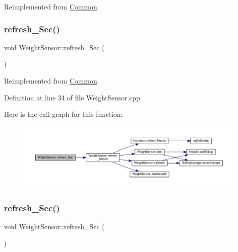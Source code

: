 Reimplemented from \hyperlink{class_common_a14e4462a94bd118028ce1d487ca0292c}{Common}.

\mbox{\label{class_weight_sensor_a6f7c6cab318b6677e43b7deb9e0b5fee}} 
\subsubsection{\texorpdfstring{refresh\+\_\+\+Sec()}{refresh\_Sec()}\hspace{0.1cm}{\footnotesize\ttfamily [1/2]}}
{\footnotesize\ttfamily void Weight\+Sensor\+::refresh\+\_\+\+Sec (\begin{DoxyParamCaption}{ }\end{DoxyParamCaption})\hspace{0.3cm}{\ttfamily [virtual]}}



Reimplemented from \hyperlink{class_common_acd1fdd47fbf8bb490f5c6d3ab6cd8d05}{Common}.



Definition at line 34 of file Weight\+Sensor.\+cpp.

Here is the call graph for this function\+:
\nopagebreak
\begin{figure}[H]
\begin{center}
\leavevmode
\includegraphics[width=350pt]{class_weight_sensor_a6f7c6cab318b6677e43b7deb9e0b5fee_cgraph}
\end{center}
\end{figure}
\mbox{\label{class_weight_sensor_a6f7c6cab318b6677e43b7deb9e0b5fee}} 
\subsubsection{\texorpdfstring{refresh\+\_\+\+Sec()}{refresh\_Sec()}\hspace{0.1cm}{\footnotesize\ttfamily [2/2]}}
{\footnotesize\ttfamily void Weight\+Sensor\+::refresh\+\_\+\+Sec (\begin{DoxyParamCaption}{ }\end{DoxyParamCaption})\hspace{0.3cm}{\ttfamily [virtual]}}



